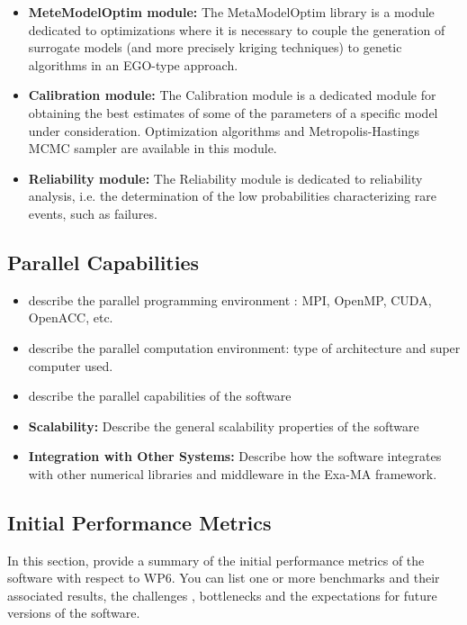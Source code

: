 \begin{itemize}
    \item \textbf{MeteModelOptim module:} The MetaModelOptim library is a module dedicated to optimizations where it is necessary to couple the generation of surrogate models (and more precisely kriging techniques) to genetic algorithms in an EGO-type approach.
    \item \textbf{Calibration module:} The Calibration module is a dedicated module for obtaining the best estimates of some of the parameters of a specific model under consideration. Optimization algorithms and Metropolis-Hastings MCMC sampler are available in this module. 
    \item \textbf{Reliability module:} The Reliability module is dedicated to reliability analysis, i.e. the determination of the low probabilities characterizing rare events, such as failures.
\end{itemize}


\subsection{Parallel Capabilities}
\label{sec:WP6:Uranie:performances}


\begin{itemize}
    \item describe the parallel programming  environment : MPI, OpenMP, CUDA, OpenACC, etc.
    \item describe the parallel computation environment: type of architecture and super computer used.
    \item describe the parallel capabilities of the software
    \item \textbf{Scalability:} Describe the general scalability properties of the software
    \item \textbf{Integration with Other Systems:} Describe how the software integrates with other numerical libraries and middleware in the Exa-MA framework.
\end{itemize}

\subsection{Initial Performance Metrics}
\label{sec:WP6:Uranie:metrics}

In this section, provide a summary of the initial performance metrics of the software with respect to WP6.
You can list one or more benchmarks and their associated results, the challenges , bottlenecks and the expectations for future versions of the software.



